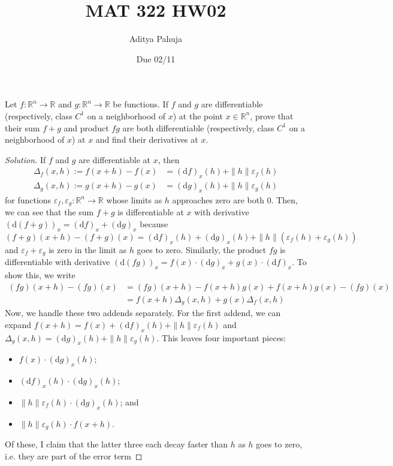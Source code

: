 \documentclass[11pt]{scrartcl}
\title{\vspace{-2em}MAT 322 HW02}
\author{\large Aditya Pahuja}
\date{\large Due 02/11}
\providecommand{\eps}{\varepsilon}
\providecommand{\RR}{\mathbb R}
\providecommand{\ii}{\item}
\newenvironment{soln}{\begin{proof}[Solution]}{\end{proof}}
\begin{document}
\maketitle

\begin{problem}
	Let $f\colon\RR^n\to\RR$ and $g\colon\RR^n\to\RR$ be functions.
	If $f$ and $g$ are differentiable
	(respectively, class $C^1$ on a neighborhood of $x$)
	at the point $x\in\RR^n$, prove that their sum $f+g$ and product $fg$
	are both differentiable
	(respectively, class $C^1$ on a neighborhood of $x$)
	at $x$ and find their derivatives at $x$.
\end{problem}

\begin{soln}
	If $f$ and $g$ are differentiable at $x$, then
	\begin{align*}
		\Delta_f(x,h) := f(x+h) - f(x) &= (\mathrm df)_x(h) + \|h\|\eps_f(h)\\
		\Delta_g(x,h) := g(x+h) - g(x) &= (\mathrm dg)_x(h) + \|h\|\eps_g(h)
	\end{align*}
	for functions $\eps_f,\eps_g\colon\RR^n\to\RR$ whose limits
	as $h$ approaches zero are both $0$.
	Then, we can see that the sum $f+g$ is differentiable at $x$
	with derivative $(\mathrm d(f+g))_x =
	\boxed{(\mathrm df)_x + (\mathrm dg)_x}$
	because
	\[(f+g)(x+h) - (f+g)(x) =
	(\mathrm df)_x(h) + (\mathrm dg)_x(h) +
	\|h\|(\eps_f(h) + \eps_g(h))\]
	and $\eps_f + \eps_g$ is zero in the limit as $h$ goes to zero.
	Similarly, the product $fg$ is differentiable with derivative
	$(\mathrm d(fg))_x =
	\boxed{f(x)\cdot(\mathrm dg)_x + g(x)\cdot(\mathrm df)_x}$.
	To show this, we write
	\begin{align*}
		(fg)(x+h) - (fg)(x) &= (fg)(x+h) -
		f(x+h)g(x) + f(x+h)g(x) - (fg)(x)\\
		&= f(x+h)\Delta_g(x,h) + g(x)\Delta_f(x,h)
	\end{align*}
	Now, we handle these two addends separately.
	For the first addend, we can expand
	$f(x+h) = f(x) + (\mathrm df)_x(h) + \|h\|\eps_f(h)$
	and $\Delta_g(x,h) = (\mathrm dg)_x(h) + \|h\|\eps_g(h)$.
	This leaves four important pieces:
	\begin{itemize}
		\ii $f(x)\cdot(\mathrm dg)_x(h)$;
		\ii $(\mathrm df)_x(h)\cdot(\mathrm dg)_x(h)$;
		\ii $\|h\|\eps_f(h)\cdot (\mathrm dg)_x(h)$; and
		\ii $\|h\|\eps_g(h)\cdot f(x+h)$.
	\end{itemize}
	Of these, I claim that the latter three each decay faster than $h$
	as $h$ goes to zero, i.e. they are part of the error term

\end{soln}
\end{document}
